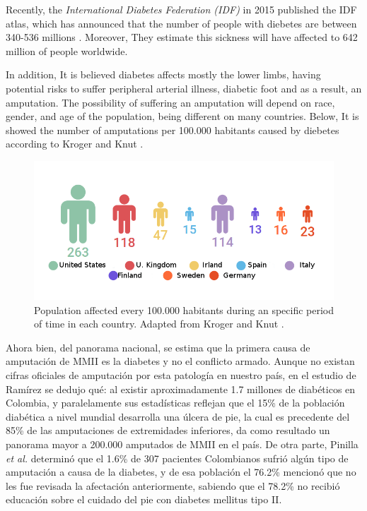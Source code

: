 \documentclass[12pt,english]{article}
\begin{document}
Recently, the \emph{International Diabetes Federation (IDF)
} in 2015 published the IDF atlas, which has announced that the number of people with diebetes are between 340-536 millions \cite{IDF2015}. Moreover, They estimate this sickness will have affected to 642 million of people worldwide.
  
In addition, It is believed diabetes affects mostly the lower limbs, having potential risks to suffer peripheral arterial illness, diabetic foot and as a result, an amputation. The possibility of suffering an amputation will depend on race, gender, and age of the population, being different on many countries. Below, It is showed the number of amputations per 100.000 habitants caused by diebetes according to Kroger and Knut \cite{KrogerKnut2015}. 

\begin{figure}[H]
\begin{centering}
\includegraphics[scale=0.5]{ampperyear}
\par\end{centering}

\caption{\label{fig:N=0000FAmero-de-amputaciones}Population affected every 100.000 habitants during an specific period of time in each country. Adapted from Kroger and Knut \cite{KrogerKnut2015}.}


\end{figure}


Ahora bien, del panorama nacional, se estima que la primera causa
de amputación de MMII es la diabetes y no el conflicto armado. Aunque
no existan cifras oficiales de amputación por esta patología en nuestro
país, en el estudio de Ramírez \cite{Ramirez2014} se dedujo qué:
al existir aproximadamente 1.7 millones de diabéticos en Colombia,
y paralelamente sus estadísticas reflejan que el 15\% de la población
diabética a nivel mundial desarrolla una úlcera de pie, la cual es
precedente del 85\% de las amputaciones de extremidades inferiores,
da como resultado un panorama mayor a 200.000 amputados de MMII en
el país. De otra parte, Pinilla \emph{et al.} \cite{Pinilla2011}
determinó que el 1.6\% de 307 pacientes Colombianos sufrió algún tipo
de amputación a causa de la diabetes, y de esa población el 76.2\%
mencionó que no les fue revisada la afectación anteriormente,  sabiendo
que el 78.2\% no recibió educación sobre el cuidado del pie con diabetes
mellitus tipo II.
\end{document}
